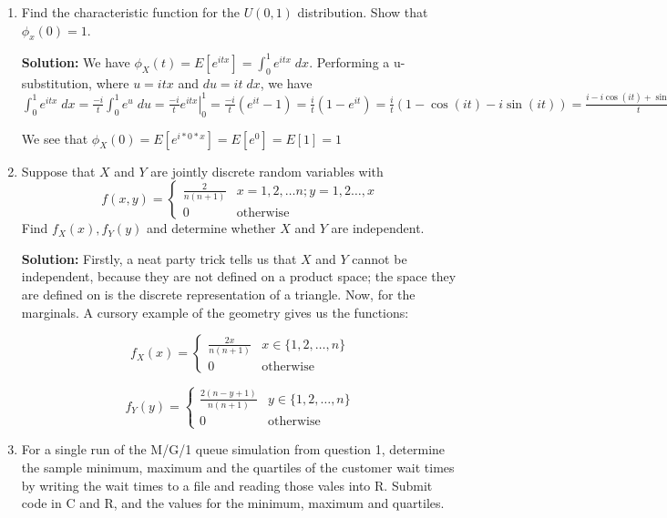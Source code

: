 \documentclass[11pt]{article} %
\newcommand{\tr}{\textrm}
\begin{document}
\begin{enumerate}
\begin{enumerate}
\end{enumerate}

\item Find the characteristic function for the $U(0,1)$ distribution.  Show that $\phi_x(0) = 1$.

{\bf Solution:} We have $\phi_X(t) = E[e^{itx}] = \int_0^1e^{itx}\;dx$.  Performing a u-substitution, where $u = itx$ and $du = it\;dx$, we have $\int_0^1e^{itx}\;dx = \frac{-i}{t}\int_0^1e^u\;du = \left.\frac{-i}{t}e^{itx}\right|_0^1 = \frac{-i}{t}(e^{it} - 1) = \frac{i}{t}(1 - e^{it}) = \frac{i}{t}(1 - \cos(it) - i\sin(it)) = \frac{i - i\cos(it) + \sin(it)}{t} = \phi_X(t)$

We see that $\phi_X(0) = E[e^{i*0*x}] = E[e^0] = E[1] = 1$

\item Suppose that $X$ and $Y$ are jointly discrete random variables with
$$f(x, y) = \left\{\begin{array}{ll} \frac{2}{n(n+1)} & x = 1, 2, \ldots n; y = 1, 2 \ldots, x \\
0 & \tr{otherwise}\end{array}\right.$$
Find $f_X(x), f_Y(y)$ and determine whether $X$ and $Y$ are independent.

{\bf Solution:} Firstly, a neat party trick tells us that $X$ and $Y$ cannot be independent, because they are not defined on a product space; the space they are defined on is the discrete representation of a triangle.  Now, for the marginals.  A cursory example of the geometry gives us the functions:

$$f_X(x) = \left\{\begin{array}{ll}
\frac{2x}{n(n+1)} & x \in \{1, 2, \ldots, n\}\\
0 & \tr{otherwise}\end{array}\right.$$

$$f_Y(y) = \left\{\begin{array}{ll}
\frac{2(n-y + 1)}{n(n+1)} & y \in \{1, 2, \ldots, n\}\\
0 & \tr{otherwise}\end{array}\right.$$ 

\item For a single run of the M/G/1 queue simulation from question 1, determine the sample minimum, maximum and the quartiles of the customer wait times by writing the wait times to a file and reading those vales into R.  Submit code in C and R, and the values for the minimum, maximum and quartiles.


\end{enumerate}
\end{document}
